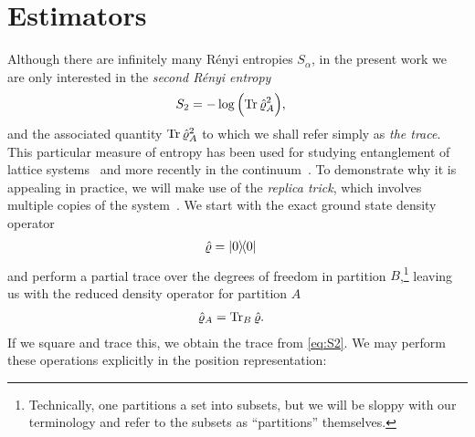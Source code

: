 \section{Estimators}

\label{sec:estimators}

Although there are infinitely many Rényi entropies $S_\alpha$, in the present work we are only interested in the \emph{second Rényi entropy}
\begin{align}
	S_2
	&= -\log{\left( \operatorname{Tr}{\hat{\varrho}_A^2} \right)},
		\label{eq:S2}
\end{align}
and the associated quantity $\operatorname{Tr}{\hat{\varrho}_A^2}$ to which we shall refer simply as \emph{the trace}.
This particular measure of entropy has been used for studying entanglement of lattice systems~\cite{hastings2010measuring,stephan2012renyi} and more recently in the continuum~\cite{herdman2014path,herdman2014particle}.
To demonstrate why it is appealing in practice, we will make use of the \emph{replica trick}, which involves multiple copies of the system~\cite{hastings2010measuring}.
We start with the exact ground state density operator
\begin{align}
	\hat{\varrho}
	&= \ket{0}\!\!\bra{0}
\end{align}
and perform a partial trace over the degrees of freedom in partition $B$,\footnote{
	Technically, one partitions a set into subsets, but we will be sloppy with our terminology and refer to the subsets as ``partitions'' themselves.
} leaving us with the reduced density operator for partition $A$
\begin{align}
	\hat{\varrho}_A
	&= \operatorname{Tr}_B{\hat{\varrho}}.
\end{align}
If we square and trace this, we obtain the trace from \cref{eq:S2}.
We may perform these operations explicitly in the position representation:
